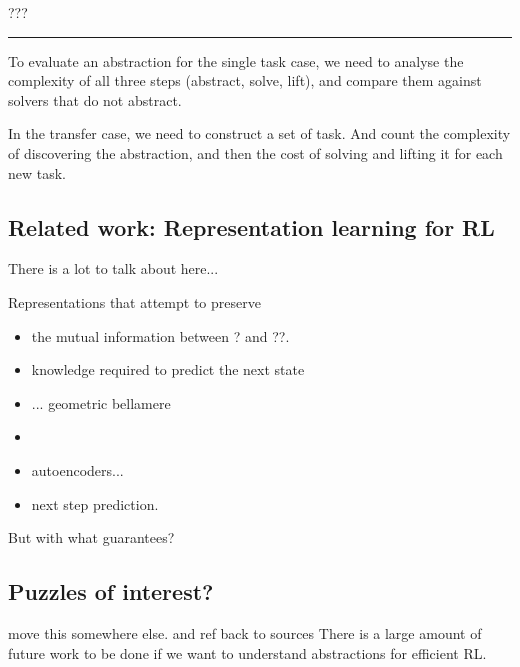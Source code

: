 ???

\begin{center}\rule{0.5\linewidth}{\linethickness}\end{center}

To evaluate an abstraction for the single task case, we need to analyse the
complexity of all three steps (abstract, solve, lift), and compare them against
solvers that do not abstract.

In the transfer case, we need to construct a set of task. And count the
complexity of discovering the abstraction, and then the cost of solving
and lifting it for each new task.

\subsection{Related work: Representation learning for RL}


{\color{red}There is a lot to talk about here...}

Representations that attempt to preserve
\begin{itemize}
\tightlist
  \item the mutual information between ? and ??.
  \item knowledge required to predict the next state
  \item ... geometric bellamere
  \item \cite{Nachum2018}
  \item autoencoders...
  \item next step prediction.
\end{itemize}

But with what guarantees?

\subsection{Puzzles of interest?}

{\color{red}move this somewhere else. and ref back to sources}
There is a large amount of future work to be done if we want to understand abstractions for efficient RL.

